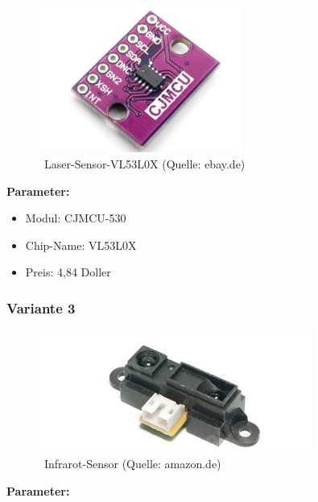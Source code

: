 \begin{figure}[htbp!]  %
	\centering\includegraphics[width=0.6\textwidth]{images/laser-sensor_v2.png}
	\caption{ \ Laser-Sensor-VL53L0X (Quelle: ebay.de)}
	\label{laser-sensor_v2} %
\end{figure}

\textbf{Parameter:}  %

\begin{itemize}
\item Modul: CJMCU-530
\item Chip-Name: VL53L0X
\item Preis: 4,84 Doller
\end{itemize}


\subsubsection{Variante 3}

\begin{figure}[ht]  %
	\centering\includegraphics[width=0.8\textwidth]{images/infrarot.png}
	\caption{ \ Infrarot-Sensor  (Quelle: amazon.de)}
	\label{infrarot} %
\end{figure}

\textbf{Parameter:}  %


